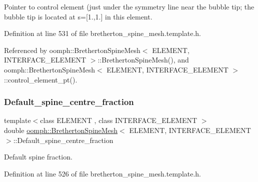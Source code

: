 Pointer to control element (just under the symmetry line near the bubble tip; the bubble tip is located at s=\mbox{[}1.,1.\mbox{]} in this element. 



Definition at line 531 of file bretherton\+\_\+spine\+\_\+mesh.\+template.\+h.



Referenced by oomph\+::\+Bretherton\+Spine\+Mesh$<$ E\+L\+E\+M\+E\+N\+T, I\+N\+T\+E\+R\+F\+A\+C\+E\+\_\+\+E\+L\+E\+M\+E\+N\+T $>$\+::\+Bretherton\+Spine\+Mesh(), and oomph\+::\+Bretherton\+Spine\+Mesh$<$ E\+L\+E\+M\+E\+N\+T, I\+N\+T\+E\+R\+F\+A\+C\+E\+\_\+\+E\+L\+E\+M\+E\+N\+T $>$\+::control\+\_\+element\+\_\+pt().

\mbox{\label{classoomph_1_1BrethertonSpineMesh_a306cf8ae8f91a81054904de64195bb16}} 
\subsubsection{\texorpdfstring{Default\+\_\+spine\+\_\+centre\+\_\+fraction}{Default\_spine\_centre\_fraction}}
{\footnotesize\ttfamily template$<$class E\+L\+E\+M\+E\+NT , class I\+N\+T\+E\+R\+F\+A\+C\+E\+\_\+\+E\+L\+E\+M\+E\+NT $>$ \\
double \hyperlink{classoomph_1_1BrethertonSpineMesh}{oomph\+::\+Bretherton\+Spine\+Mesh}$<$ E\+L\+E\+M\+E\+NT, I\+N\+T\+E\+R\+F\+A\+C\+E\+\_\+\+E\+L\+E\+M\+E\+NT $>$\+::Default\+\_\+spine\+\_\+centre\+\_\+fraction\hspace{0.3cm}{\ttfamily [protected]}}



Default spine fraction. 



Definition at line 526 of file bretherton\+\_\+spine\+\_\+mesh.\+template.\+h.

\mbox{\label{classoomph_1_1BrethertonSpineMesh_a3d711e1bc9d751ab14662f6839a900e3}} 
